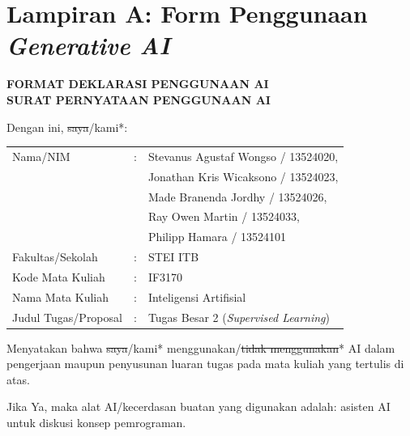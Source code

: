 {}
\section*{Lampiran A: Form Penggunaan \textit{Generative AI}}

\begingroup
\small
\begin{center}
  \textbf{FORMAT DEKLARASI PENGGUNAAN AI} \\
  \textbf{SURAT PERNYATAAN PENGGUNAAN AI}
\end{center}

Dengan ini, \sout{saya}/kami*:
\begin{center}
\begin{tabular}{lll}
  Nama/NIM & : & Stevanus Agustaf Wongso / 13524020, \\
   & & Jonathan Kris Wicaksono / 13524023, \\
   & & Made Branenda Jordhy / 13524026, \\
   & & Ray Owen Martin / 13524033, \\
   & & Philipp Hamara / 13524101 \\
  Fakultas/Sekolah & : & STEI ITB \\
  Kode Mata Kuliah & : & IF3170 \\
  Nama Mata Kuliah & : & Inteligensi Artifisial \\
  Judul Tugas/Proposal & : & Tugas Besar 2 (\textit{Supervised Learning}) \\
\end{tabular}
\end{center}

Menyatakan bahwa \sout{saya}/kami* menggunakan/\sout{tidak menggunakan}* AI dalam
pengerjaan maupun penyusunan luaran tugas pada mata kuliah yang tertulis
di atas.

Jika Ya, maka alat AI/kecerdasan buatan yang digunakan adalah: asisten AI
untuk diskusi konsep pemrograman.

